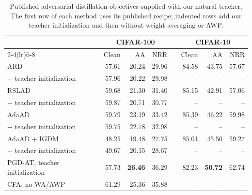 \documentclass{article} %
\theoremstyle{plain}
\begin{document}
\begin{table}[!htbp]
  \centering \small \setlength{\tabcolsep}{4pt}
  \caption{Published adversarial-distillation objectives supplied with our natural teacher. The first
  row of each method uses its published recipe; indented rows add our teacher initialization and then
  without weight averaging or AWP.}
  \label{tab:natteacher}
  \begin{tabular}{lrrrcrrr}
    \toprule
    & \multicolumn{3}{c}{CIFAR-100} && \multicolumn{3}{c}{CIFAR-10} \\
    \cmidrule(lr){2-4}\cmidrule(lr){6-8}
    & Clean & AA & NRR && Clean & AA & NRR \\
    \midrule
    ARD & 57.61 & 20.24 & 29.96 && 84.58 & 43.75 & 57.67 \\
    \quad + teacher initialization & 57.96 & 20.22 & 29.98 && -- & -- & -- \\
    RSLAD & 59.68 & 21.30 & 31.40 && 85.15 & 42.91 & 57.06 \\
    \quad + teacher initialization & 59.87 & 20.71 & 30.77 && -- & -- & -- \\
    AdaAD & 59.79 & 23.19 & 33.42 && 85.39 & 46.22 & 59.98 \\
    \quad + teacher initialization & 59.75 & 22.78 & 32.98 && -- & -- & -- \\
    AdaAD + IGDM & 48.25 & 19.48 & 27.75 && 85.01 & 45.50 & 59.27 \\
    \quad + teacher initialization & 49.67 & 20.15 & 28.67 && -- & -- & -- \\
    \midrule
    PGD-AT, teacher initialization & 57.73 & \textbf{26.46} & 36.29 && 82.23 & \textbf{50.72} & 62.74 \\
    CFA, no WA/AWP & 61.29 & 25.36 & 35.88 && -- & -- & -- \\
    \bottomrule
  \end{tabular}
\end{table}
\end{document}
